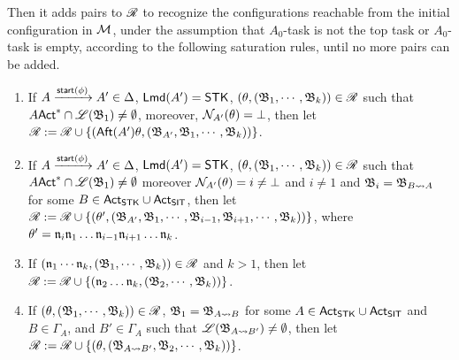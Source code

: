 Then it adds pairs to $\mathscr{R}$ to recognize the configurations reachable from the initial configuration in ${\mathcal{M} }$, under the assumption that $A_0$-task is not the top task or $A_0$-task is empty, according to the following saturation rules, until no more pairs can be added.

\smallskip
\fbox
{
\begin{minipage}{0.9\textwidth}
\begin{enumerate}
    \item If $A\xrightarrow{{\mathsf{start} }(\phi)}A'\in\Delta$, ${\sf Lmd}(A') = \mathsf{STK}$, 
    $(\theta, ({\mathfrak{B} }_1,\cdots,{\mathfrak{B} }_k)) \in \mathscr{R}$ such that $A{\sf Act}^*\cap{\mathscr{L} }({\mathfrak{B} }_1)\neq \emptyset$, moreover, $\mathcal{N}_{A'}(\theta) = \bot$, 
    then let $\mathscr{R}:=\mathscr{R}\cup\{({\sf Aft}(A')\theta, ({\mathfrak{B} }_{A'},{\mathfrak{B} }_1,\cdots,{\mathfrak{B} }_k))\}$.
    \item If $A\xrightarrow{{\mathsf{start} }(\phi)}A'\in\Delta$, ${\sf Lmd}(A') = \mathsf{STK}$, $(\theta, ({\mathfrak{B} }_1,\cdots,{\mathfrak{B} }_k)) \in \mathscr{R}$ such that $A{\sf Act}^*\cap{\mathscr{L} }({\mathfrak{B} }_1)\neq \emptyset$ moreover $\mathcal{N}_{A'}(\theta) = i \neq\bot$ and $i\neq 1$ and ${\mathfrak{B} }_i = {\mathfrak{B} }_{B\rightsquigarrow A}$ for some $B\in{\sf Act}_{\mathsf{STK}}\cup{\sf Act}_{\mathsf{SIT}}$,
    then let $\mathscr{R}:=\mathscr{R}\cup\{(\theta', ({\mathfrak{B} }_{A'},{\mathfrak{B} }_1,\cdots,{\mathfrak{B} }_{i-1},{\mathfrak{B} }_{i+1},\cdots,{\mathfrak{B} }_{k}))\}$, where $\theta' = \mathfrak{n}_i\mathfrak{n}_1\dots\mathfrak{n}_{i-1}\mathfrak{n}_{i+1}\dots\mathfrak{n}_k$.
    \item If $(\mathfrak{n}_1\cdots\mathfrak{n}_k, ({\mathfrak{B} }_1,\cdots,{\mathfrak{B} }_k)) \in \mathscr{R}$ and $k>1$,
    then let $\mathscr{R}:=\mathscr{R}\cup\{(\mathfrak{n}_2\dots\mathfrak{n}_k, ({\mathfrak{B} }_2,\cdots,{\mathfrak{B} }_k))\}$.
    \item If $(\theta, ({\mathfrak{B} }_1,\cdots,{\mathfrak{B} }_k)) \in \mathscr{R}$, ${\mathfrak{B} }_1 = {\mathfrak{B} }_{A\rightsquigarrow B}$ for some $A\in{\sf Act}_{\mathsf{STK}}\cup{\sf Act}_{\mathsf{SIT}}$ and $B \in \Gamma_A$, and $B'  \in \Gamma_A$ such that ${\mathscr{L} }({\mathfrak{B} }_{A\rightsquigarrow B'}) \neq \emptyset$, then let 
    $\mathscr{R} := \mathscr{R} \cup \{(\theta, ({\mathfrak{B} }_{A\rightsquigarrow B'}, {\mathfrak{B} }_2,\cdots,{\mathfrak{B} }_k))\}$. 
\end{enumerate}
\end{minipage}
}
